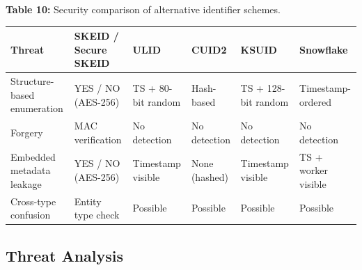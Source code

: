 \documentclass[fleqn,10pt,lineno]{wlpeerj}
\newcounter{none} %
\begin{document}
\textbf{Table 10:} Security comparison of alternative identifier
schemes.

{\def\LTcaptype{none} %
\begin{longtable}[]{@{}
  >{\raggedright\arraybackslash}p{}
  >{\raggedright\arraybackslash}p{}
  >{\raggedright\arraybackslash}p{}
  >{\raggedright\arraybackslash}p{}
  >{\raggedright\arraybackslash}p{}
  >{\raggedright\arraybackslash}p{}@{}}
\toprule\noalign{}
\begin{minipage}[b]{\linewidth}\raggedright
Threat
\end{minipage} & \begin{minipage}[b]{\linewidth}\raggedright
SKEID / Secure SKEID
\end{minipage} & \begin{minipage}[b]{\linewidth}\raggedright
ULID
\end{minipage} & \begin{minipage}[b]{\linewidth}\raggedright
CUID2
\end{minipage} & \begin{minipage}[b]{\linewidth}\raggedright
KSUID
\end{minipage} & \begin{minipage}[b]{\linewidth}\raggedright
Snowflake
\end{minipage} \\
\midrule\noalign{}
\endhead
\bottomrule\noalign{}
\endlastfoot
Structure-based enumeration & YES / NO (AES-256) & TS + 80-bit random &
Hash-based & TS + 128-bit random & Timestamp-ordered \\
Forgery & MAC verification & No detection & No detection & No detection
& No detection \\
Embedded metadata leakage & YES / NO (AES-256) & Timestamp visible &
None (hashed) & Timestamp visible & TS + worker visible \\
Cross-type confusion & Entity type check & Possible & Possible &
Possible & Possible \\
\end{longtable}
}

\subsection{Threat Analysis}\label{threat-analysis}
\end{document}
